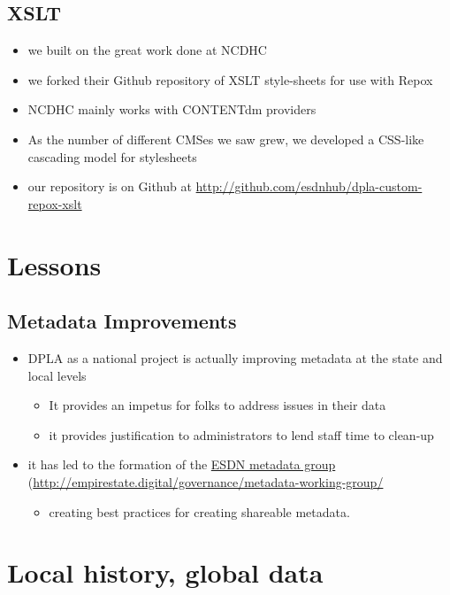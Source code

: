 \documentclass[11pt]{article}
\begin{document}
\subsection*{XSLT}
\label{sec:orgc9706bf}
\begin{itemize}
\item we built on the great work done at NCDHC
\item we forked their Github repository of XSLT style-sheets for use with Repox
\item NCDHC mainly works with CONTENTdm providers
\item As the number of different CMSes we saw grew, we developed a CSS-like cascading model for stylesheets
\item our repository is on Github at \href{http://github.com/esdnhub/dpla-custom-repox-xslt}{\url{http://github.com/esdnhub/dpla-custom-repox-xslt}}
\end{itemize}

\section*{Lessons}
\label{sec:org16bfd19}
\subsection*{Metadata Improvements}
\label{sec:orgde3f02e}
\begin{itemize}
\item DPLA as a national project is actually improving metadata at the state and local levels
\begin{itemize}
\item It provides an impetus for folks to address issues in their data
\item it provides justification to administrators to lend staff time to clean-up
\end{itemize}
\item it has led to the formation of the \href{http://empirestate.digital/governance/metadata-working-group/}{ESDN metadata group} (\href{http://empirestate.digital/governance/metadata-working-group/}{\url{http://empirestate.digital/governance/metadata-working-group/}}
\begin{itemize}
\item creating best practices for creating shareable metadata.
\end{itemize}
\end{itemize}

\section*{Local history, global data}
\label{sec:org4cc5d3e}
\end{document}
